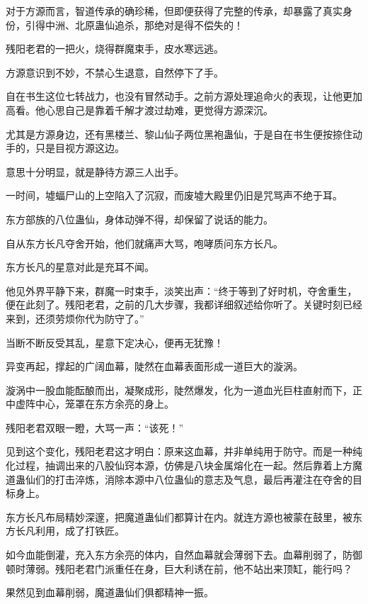 
\begin{this_body}

对于方源而言，智道传承的确珍稀，但即便获得了完整的传承，却暴露了真实身份，引得中洲、北原蛊仙追杀，那绝对是得不偿失的！

残阳老君的一把火，烧得群魔束手，皮水寒远逃。

方源意识到不妙，不禁心生退意，自然停下了手。

自在书生这位七转战力，也没有冒然动手。之前方源处理追命火的表现，让他更加高看。他心思自己是靠着千解才渡过劫难，更觉得方源深沉。

尤其是方源身边，还有黑楼兰、黎山仙子两位黑袍蛊仙，于是自在书生便按捺住动手的，只是目视方源这边。

意思十分明显，就是静待方源三人出手。

一时间，墟蝠尸山的上空陷入了沉寂，而废墟大殿里仍旧是咒骂声不绝于耳。

东方部族的八位蛊仙，身体动弹不得，却保留了说话的能力。

自从东方长凡夺舍开始，他们就痛声大骂，咆哮质问东方长凡。

东方长凡的星意对此是充耳不闻。

他见外界平静下来，群魔一时束手，淡笑出声：“终于等到了好时机，夺舍重生，便在此刻了。残阳老君，之前的几大步骤，我都详细叙述给你听了。关键时刻已经来到，还须劳烦你代为防守了。”

当断不断反受其乱，星意下定决心，便再无犹豫！

异变再起，撑起的广阔血幕，陡然在血幕表面形成一道巨大的漩涡。

漩涡中一股血能酝酿而出，凝聚成形，陡然爆发，化为一道血光巨柱直射而下，正中虚阵中心，笼罩在东方余亮的身上。

残阳老君双眼一瞪，大骂一声：“该死！”

见到这个变化，残阳老君这才明白：原来这血幕，并非单纯用于防守。而是一种纯化过程，抽调出来的八股仙窍本源，仿佛是八块金属熔化在一起。然后靠着上方魔道蛊仙们的打击淬炼，消除本源中八位蛊仙的意志及气息，最后再灌注在夺舍的目标身上。

东方长凡布局精妙深邃，把魔道蛊仙们都算计在内。就连方源也被蒙在鼓里，被东方长凡利用，成了打铁匠。

如今血能倒灌，充入东方余亮的体内，自然血幕就会薄弱下去。血幕削弱了，防御顿时薄弱。残阳老君门派重任在身，巨大利诱在前，他不站出来顶缸，能行吗？

果然见到血幕削弱，魔道蛊仙们俱都精神一振。


\end{this_body}

